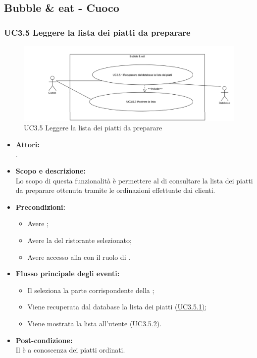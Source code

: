 \subsection{Bubble \& eat - Cuoco}

\subsubsection{UC3.5 Leggere la lista dei piatti da preparare} \label{UC3.5}

\begin{figure}[H]
	\centering
	\includegraphics[width=15cm]{../../documenti/AnalisiDeiRequisiti/Diagrammi_img/uc3_5.png}
	\caption{UC3.5 Leggere la lista dei piatti da preparare}
\end{figure}

\begin{itemize}
	\item \textbf{Attori:}
	\\.
	\item \textbf{Scopo e descrizione:} 
	\\Lo scopo di questa funzionalità è permettere al  di consultare la lista dei piatti da preparare ottenuta tramite le ordinazioni effettuate dai clienti.
	\item \textbf{Precondizioni:}
	\begin{itemize}
		\item Avere ;
		\item Avere la  del ristorante selezionato;
		\item Avere accesso alla  con il ruolo di .
	\end{itemize}
	\item \textbf{Flusso principale degli eventi:}
	\begin{itemize}
		\item Il  seleziona la parte corrispondente della ;
		\item Viene recuperata dal database la lista dei piatti \hyperref[UC3.5.1]{(UC3.5.1)};
		\item Viene mostrata la lista all'utente \hyperref[UC3.5.2]{(UC3.5.2)}.
	\end{itemize}
	\item \textbf{Post-condizione:}
	\\Il {} è a conoscenza dei piatti ordinati.
\end{itemize}

